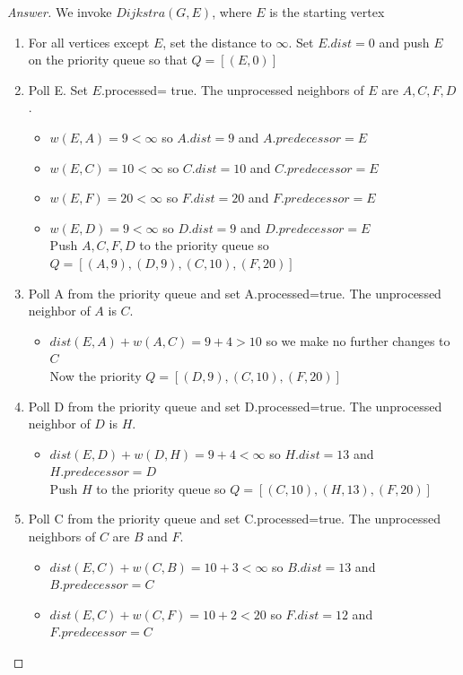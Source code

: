 \documentclass[11pt]{article}
\theoremstyle{definition}
\theoremstyle{definition}
\theoremstyle{definition}
\begin{document}
\begin{proof}[Answer]

We invoke $Dijkstra(G, E)$, where $E$ is the starting vertex \\

\begin{enumerate}
\item For all vertices except $E$, set the distance to $\infty$. Set $E.dist= 0$ and push $E$ on the priority queue so that $Q= [(E,0)]$
\item Poll E. Set $E$.processed= true. The unprocessed neighbors of $E$ are $A, C, F, D$. 
	\begin{itemize}
	\item $w({E,A})= 9 < \infty$ so $A.dist=9$ and $A.predecessor= E$
	\item $w({E,C})= 10 < \infty$ so $C.dist=10$ and $C.predecessor= E$
	\item $w({E,F})= 20 < \infty$ so $F.dist=20$ and $F.predecessor= E$
	\item $w({E,D})= 9 < \infty$ so $D.dist=9$ and $D.predecessor= E$  \\
	Push $A, C, F, D$ to the priority queue so $Q= [(A,9), (D,9), (C,10), (F,20)]$
	\end{itemize}
\item Poll A from the priority queue and set A.processed=true. The unprocessed neighbor of $A$ is $C$.
	\begin{itemize}
	\item $dist(E,A) + w({A,C})= 9+4 > 10$ so we make no further changes to $C$\\
	Now the priority $Q= [(D,9), (C,10), (F,20)]$
	\end{itemize}
\item Poll D from the priority queue and set D.processed=true. The unprocessed neighbor of $D$ is $H$.
	\begin{itemize}
	\item $dist(E,D) + w({D,H})= 9+4 < \infty $ so $H.dist=13$ and $H.predecessor= D$\\
	Push $H$ to the priority queue so $Q= [(C,10), (H,13), (F,20)]$
	\end{itemize}
\item Poll C from the priority queue and set C.processed=true. The unprocessed neighbors of $C$ are $B$ and $F$.
	\begin{itemize}
	\item $dist(E,C) + w({C,B})= 10+3 < \infty $ so $B.dist=13$ and $B.predecessor= C$
	\item $dist(E,C) + w({C,F})= 10+2 < 20 $ so $F.dist=12$ and $F.predecessor= C$\\

\end{itemize}
\end{enumerate}
\end{proof}
\end{document}
